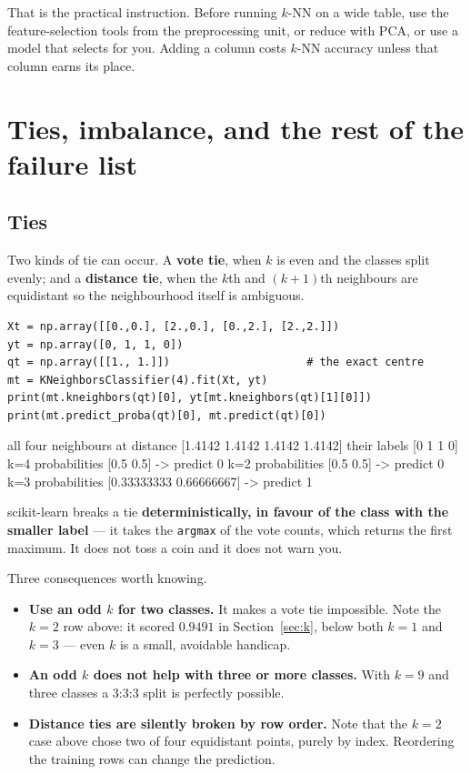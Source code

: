 \documentclass[11pt]{article}
\begin{document}
That is the practical instruction. Before running $k$-NN on a wide table, use
the feature-selection tools from the preprocessing unit, or reduce with PCA,
or use a model that selects for you. Adding a column costs $k$-NN accuracy
unless that column earns its place.

\section{Ties, imbalance, and the rest of the failure list}
\label{sec:practical}

\subsection{Ties}

Two kinds of tie can occur. A \textbf{vote tie}, when $k$ is even and the
classes split evenly; and a \textbf{distance tie}, when the $k$th and
$(k{+}1)$th neighbours are equidistant so the neighbourhood itself is
ambiguous.

\begin{lstlisting}
Xt = np.array([[0.,0.], [2.,0.], [0.,2.], [2.,2.]])
yt = np.array([0, 1, 1, 0])
qt = np.array([[1., 1.]])                     # the exact centre
mt = KNeighborsClassifier(4).fit(Xt, yt)
print(mt.kneighbors(qt)[0], yt[mt.kneighbors(qt)[1][0]])
print(mt.predict_proba(qt)[0], mt.predict(qt)[0])
\end{lstlisting}
\begin{codeout}
all four neighbours at distance [1.4142 1.4142 1.4142 1.4142]
their labels [0 1 1 0]
k=4 probabilities [0.5 0.5] -> predict 0
k=2 probabilities [0.5 0.5] -> predict 0
k=3 probabilities [0.33333333 0.66666667] -> predict 1
\end{codeout}

\begin{keyidea}
scikit-learn breaks a tie \textbf{deterministically, in favour of the class
with the smaller label} --- it takes the \texttt{argmax} of the vote counts,
which returns the first maximum. It does not toss a coin and it does not warn
you.
\end{keyidea}

Three consequences worth knowing.

\begin{itemize}[leftmargin=*]
  \item \textbf{Use an odd $k$ for two classes.} It makes a vote tie
    impossible. Note the $k=2$ row above: it scored $0.9491$ in
    Section~\ref{sec:k}, below both $k=1$ and $k=3$ --- even $k$ is a small,
    avoidable handicap.
  \item \textbf{An odd $k$ does not help with three or more classes.} With
    $k=9$ and three classes a $3$:$3$:$3$ split is perfectly possible.
  \item \textbf{Distance ties are silently broken by row order.} Note that the
    $k=2$ case above chose two of four equidistant points, purely by index.
    Reordering the training rows can change the prediction.
\end{itemize}
\end{document}
